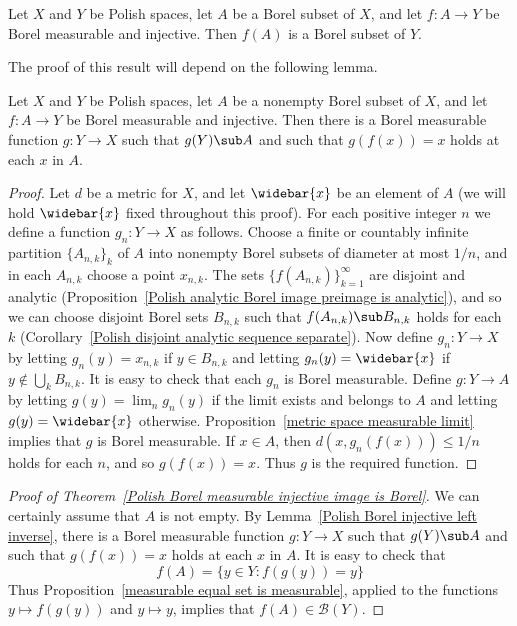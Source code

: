 \begin{theorem}\label{Polish Borel measurable injective image is Borel}
Let $X$ and $Y$ be Polish spaces, let $A$ be a Borel subset of $X$, and let $f:A\to Y$ be Borel measurable and injective. Then $f(A)$ is a Borel subset of $Y$.
\end{theorem}
The proof of this result will depend on the following lemma.
\begin{lemma}\label{Polish Borel injective left inverse}
Let $X$ and $Y$ be Polish spaces, let $A$ be a nonempty Borel subset of $X$, and let $f:A\to Y$ be Borel measurable and injective. Then there is a Borel measurable function $g:Y\to X$ such that $g(Y)\sub A$ and such that $g(f(x))=x$ holds at each $x$ in $A$.
\end{lemma}
\begin{proof}
Let $d$ be a metric for $X$, and let $\widebar{x}$ be an element of $A$ (we will hold $\widebar{x}$ fixed throughout this proof). For each positive integer $n$ we define a function $g_n:Y\to X$ as follows. Choose a finite or countably infinite partition $\{A_{n,k}\}_k$ of $A$ into nonempty Borel subsets of diameter at most $1/n$, and in each $A_{n,k}$ choose a point $x_{n,k}$. The sets $\{f(A_{n,k})\}_{k=1}^{\infty}$ are disjoint and analytic (Proposition~\ref{Polish analytic Borel image preimage is analytic}), and so we can choose disjoint Borel sets $B_{n,k}$ such that $f(A_{n,k})\sub B_{n,k}$ holds for each $k$ (Corollary~\ref{Polish disjoint analytic sequence separate}). Now define $g_n:Y\to X$ by letting $g_n(y)=x_{n,k}$ if $y\in B_{n,k}$ and letting $g_n(y)=\widebar{x}$ if $y\notin\bigcup_kB_{n,k}$. It is easy to check that each $g_n$ is Borel measurable. Define $g:Y\to A$ by letting $g(y)=\lim_ng_n(y)$ if the limit exists and belongs to $A$ and letting $g(y)=\widebar{x}$ otherwise. Proposition~\ref{metric space measurable limit} implies that $g$ is Borel measurable. If $x\in A$, then $d(x,g_n(f(x)))\leq 1/n$ holds for each $n$, and so $g(f(x))=x$. Thus $g$ is the required function.
\end{proof}
\begin{proof}[Proof of Theorem~\ref{Polish Borel measurable injective image is Borel}]
We can certainly assume that $A$ is not empty. By Lemma~\ref{Polish Borel injective left inverse}, there is a Borel measurable function $g:Y\to X$ such that $g(Y)\sub A$ and such that $g(f(x))=x$ holds at each $x$ in $A$. It is easy to check that
\[f(A)=\{y\in Y:f(g(y))=y\}\]
Thus Proposition~\ref{measurable equal set is measurable}, applied to the functions $y\mapsto f(g(y))$ and $y\mapsto y$, implies that $f(A)\in\mathcal{B}(Y)$.
\end{proof}
